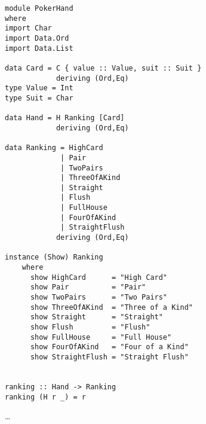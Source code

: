 \begin{lstlisting}[frame=single]
module PokerHand
where
import Char
import Data.Ord
import Data.List

data Card = C { value :: Value, suit :: Suit } 
            deriving (Ord,Eq)
type Value = Int
type Suit = Char

data Hand = H Ranking [Card]
            deriving (Ord,Eq)

data Ranking = HighCard
             | Pair
             | TwoPairs
             | ThreeOfAKind
             | Straight
             | Flush
             | FullHouse
             | FourOfAKind
             | StraightFlush
            deriving (Ord,Eq)

instance (Show) Ranking
    where
      show HighCard      = "High Card"
      show Pair          = "Pair" 
      show TwoPairs      = "Two Pairs" 
      show ThreeOfAKind  = "Three of a Kind" 
      show Straight      = "Straight" 
      show Flush         = "Flush" 
      show FullHouse     = "Full House" 
      show FourOfAKind   = "Four of a Kind"
      show StraightFlush = "Straight Flush"


ranking :: Hand -> Ranking
ranking (H r _) = r
\end{lstlisting}
\dots
\lhN
\lhA
